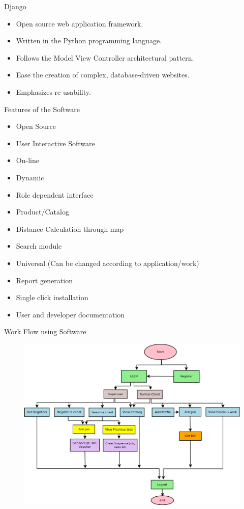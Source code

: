 \begin{frame}[t,fragile]{Django}
\begin{itemize}
\item Open source web application framework.
\item Written in the Python programming language.
\item Follows the Model View Controller architectural pattern.
\item Ease the creation of complex, database-driven websites.
\item Emphasizes re-usability.
\end{itemize}
\end{frame}

\begin{frame}[t,fragile]{Features of the Software}
\begin{itemize}
\item Open Source
\item User Interactive Software
\item On-line
\item Dynamic
\item Role dependent interface
\item Product/Catalog
\item Distance Calculation through map
\item Search module
\item Universal (Can be changed according to application/work)
\item Report generation
\item Single click installation
\item User and developer documentation

\end{itemize}

\end{frame}
\watermarkoff
{

\begin{frame}[t,fragile]{Work Flow using Software}
\begin{figure}
\includegraphics[height=0.6\paperheight]{automation}
\end{figure}
\end{frame}
}

